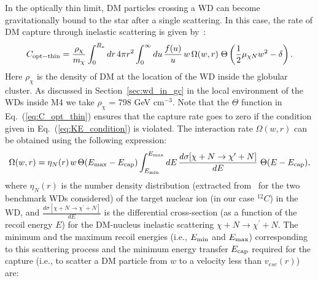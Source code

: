 \documentclass[11pt]{article}
\begin{document}
In the optically thin limit, DM particles crossing a WD can become 
gravitationally bound to the star after a single scattering. In this case, the rate of DM capture through inelastic scattering 
is given by~\cite{idm_sun_Catena_2018, idm_sun_Shu_2010, idm_sun_Menon_2009, idm_sun_Nussinov_2009}:
\begin{equation}
C_{\rm opt-thin} = \frac{\rho_{\chi}}{m_{\chi}} \int_0^{R_*} dr \hspace{0.5mm} 4 \pi r^2 
\int_0^{\infty} du \hspace{0.5mm} \frac{f(u)}{u} \hspace{0.5mm} w \hspace{0.5mm} \Omega (w,r) 
\hspace{1mm} \Theta \left(\frac{1}{2} \mu_{\chi N} w^2 - \delta \right) .
\label{eq:C_opt_thin}
\end{equation}
Here $\rho_{\chi}$ is the density of DM at the location of the WD inside the globular cluster. 
As discussed in Section~\ref{sec:wd_in_gc} in the local environment of the WDs inside M4 we take $\rho_{\chi}$ = 798 GeV cm$^{-3}$.
Note that the $\Theta$ function in Eq.~(\ref{eq:C_opt_thin}) ensures that the capture rate goes to zero 
if the condition given in Eq.~(\ref{eq:KE_condition}) is violated.
The interaction rate $\Omega (w,r)$ can be obtained using the following expression:
\begin{equation}
\Omega (w,r) = \eta_{N}(r) \hspace{0.5mm} w \hspace{0.5mm} \Theta(E_{\rm max}-E_{\rm cap}) 
\int_{E_{\rm min}}^{E_{\rm max}} dE \hspace{0.5mm} \frac{d\sigma[\chi+N \rightarrow \chi^{\prime}+N]}{dE} \hspace{1mm} \Theta(E-E_{\rm cap}) ,
\label{eq:interaction_rate}
\end{equation} 
where $\eta_{N}(r)$ is the number density distribution 
(extracted from~\cite{improved_WD_2021} for the two benchmark WDs considered) 
of the target nuclear ion (in our case $^{12}C$) in the WD, 
and $\frac{d\sigma[\chi+N \rightarrow \chi^{\prime}+N]}{dE}$ is the differential cross-section 
(as a function of the recoil energy $E$) for the DM-nucleus inelastic scattering 
$\chi+N \rightarrow \chi^{\prime}+N$. 
 The minimum and the maximum recoil 
energies (i.e., $E_{\rm min}$ and $E_{\rm max}$) corresponding to this scattering process and 
the minimum energy transfer $E_{\rm cap}$ required for 
the capture (i.e., to scatter a DM particle from $w$ to a velocity less than $v_{esc}(r)$) are: 
\end{document}
